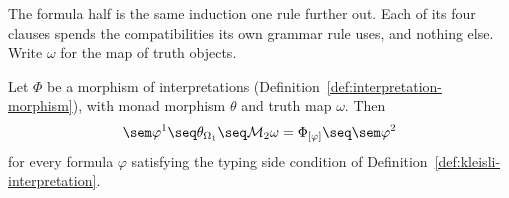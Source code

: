 The formula half is the same induction one rule further out. Each of its
four clauses spends the compatibilities its own grammar rule uses, and
nothing else. Write $\omega$ for the map of truth objects.

\begin{lemma}
\label{lem:kleisli-formula-natural}
\leanok
Let $\Phi$ be a morphism of interpretations
(Definition~\ref{def:interpretation-morphism}), with monad morphism
$\theta$ and truth map $\omega$. Then
\[
  \sem\varphi^1 \seq \theta_{\Omega_1} \seq \mathcal M_2\omega
  = \Phi_{[\varphi]} \seq \sem\varphi^2
\]
for every formula $\varphi$ satisfying the typing side condition of
Definition~\ref{def:kleisli-interpretation}.
\end{lemma}

